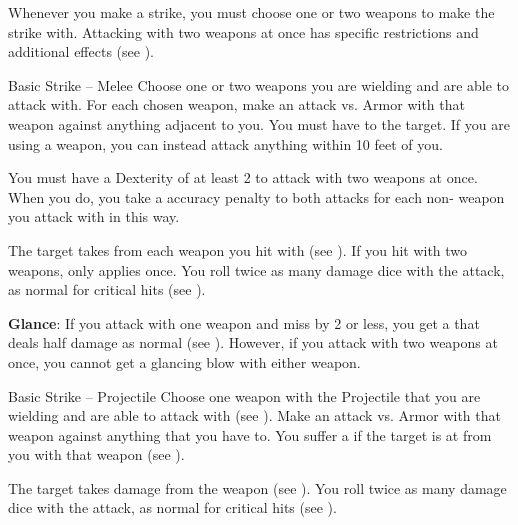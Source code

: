         Whenever you make a strike, you must choose one or two weapons to make the strike with.
        Attacking with two weapons at once has specific restrictions and additional effects (see ).

        \begin{activeability}{Basic Strike -- Melee}
            \label{Melee Strike}
            \rankline
            Choose one or two weapons you are wielding and are able to attack with.
            For each chosen weapon, make an attack vs. Armor with that weapon against anything adjacent to you.
            You must have  to the target.
            If you are using a  weapon, you can instead attack anything within 10 feet of you.

            You must have a Dexterity of at least 2 to attack with two weapons at once.
            When you do, you take a  accuracy penalty to both attacks for each non- weapon you attack with in this way.

            \hit The target takes  from each weapon you hit with (see ).
            If you hit with two weapons,  only applies once.
            \crit You roll twice as many damage dice with the attack, as normal for critical hits (see ).
            \par \textbf{Glance}: If you attack with one weapon and miss by 2 or less, you get a  that deals half damage as normal (see ).
            However, if you attack with two weapons at once, you cannot get a glancing blow with either weapon.
        \end{activeability}

        \begin{activeability}{Basic Strike -- Projectile}
            \label{Projectile Strike}
            \rankline
            Choose one weapon with the Projectile  that you are wielding and are able to attack with (see ).
            Make an attack vs. Armor with that weapon against anything that you have  to.
            You suffer a  if the target is at  from you with that weapon (see ).

            \hit The target takes damage from the weapon (see ).
            \crit You roll twice as many damage dice with the attack, as normal for critical hits (see ).
        \end{activeability}

